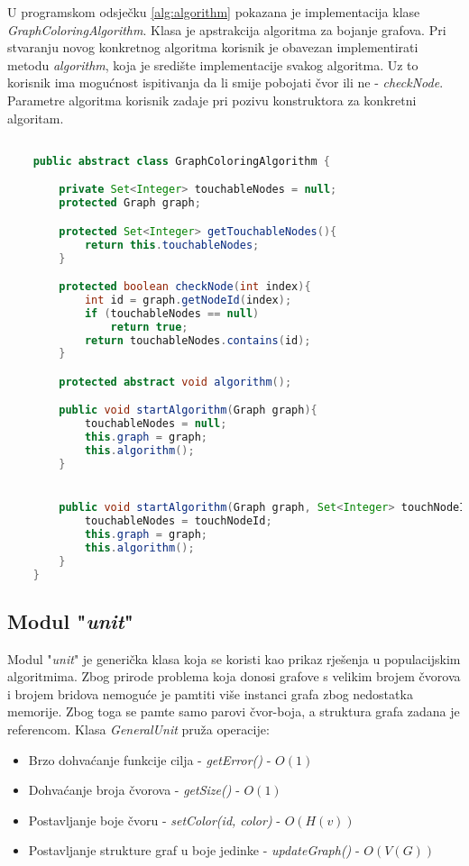 \documentclass[times, utf8, diplomski, numeric]{fer}
\begin{document}
U programskom odsječku \ref{alg:algorithm} pokazana je implementacija klase \emph{GraphColoringAlgorithm}. Klasa je apstrakcija algoritma za bojanje grafova. Pri stvaranju novog konkretnog algoritma korisnik je obavezan implementirati metodu \emph{algorithm}, koja je središte implementacije svakog algoritma. Uz to korisnik ima mogućnost ispitivanja da li smije pobojati čvor ili ne - \emph{checkNode}. Parametre algoritma korisnik zadaje pri pozivu konstruktora za konkretni algoritam.

\begin{singlespace}
	\begin{lstlisting}[label=alg:algorithm, language=Java, caption=Apstraktna klasa algoritma]

	public abstract class GraphColoringAlgorithm {

		private Set<Integer> touchableNodes = null;
		protected Graph graph;

		protected Set<Integer> getTouchableNodes(){
			return this.touchableNodes;
		}

		protected boolean checkNode(int index){
			int id = graph.getNodeId(index);
			if (touchableNodes == null)
				return true;
			return touchableNodes.contains(id);
		}

		protected abstract void algorithm();

		public void startAlgorithm(Graph graph){
			touchableNodes = null;
			this.graph = graph;
			this.algorithm();
		}


		public void startAlgorithm(Graph graph, Set<Integer> touchNodeId){
			touchableNodes = touchNodeId;
			this.graph = graph;
			this.algorithm();
		}
	}
	\end{lstlisting}
\end{singlespace}

\subsection{Modul "\emph{unit}"}

Modul "\emph{unit}" je generička klasa koja se koristi kao prikaz rješenja u populacijskim algoritmima. Zbog prirode problema koja donosi grafove s velikim brojem čvorova i brojem bridova nemoguće je pamtiti više instanci grafa zbog nedostatka memorije. Zbog toga se pamte samo parovi čvor-boja, a struktura grafa zadana je referencom. Klasa \emph{GeneralUnit} pruža operacije: 

\begin{itemize}
	\item Brzo dohvaćanje funkcije cilja - \emph{getError()} - $O(1)$
	\item Dohvaćanje broja čvorova - \emph{getSize()} - $O(1)$
	\item Postavljanje boje čvoru - \emph{setColor(id, color)} - $O(H(v))$
	\item Postavljanje strukture graf u boje jedinke - \emph{updateGraph()} - $O(V(G))$
\end{itemize}
\end{document}
